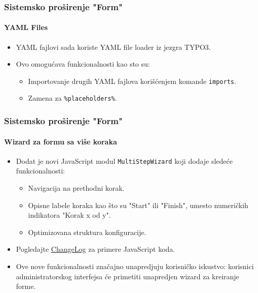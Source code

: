 
\begin{frame}[fragile]
	\frametitle{Sistemsko proširenje "Form"}
	\framesubtitle{YAML Files}

	\begin{itemize}
		\item YAML fajlovi sada koriste YAML file loader iz jezgra TYPO3.
		\item Ovo omogućava funkcionalnosti kao sto su:

			\begin{itemize}
				\item Importovanje drugih YAML fajlova korišćenjem komande \texttt{imports}.
				\item Zamena za \texttt{\%placeholders\%}.
			\end{itemize}

	\end{itemize}

\end{frame}


\begin{frame}[fragile]
	\frametitle{Sistemsko proširenje "Form"}
	\framesubtitle{Wizard za formu sa više koraka}

	\begin{itemize}
		\item Dodat je novi JavaScript modul \texttt{MultiStepWizard} koji dodaje sledeće
			funkcionalnosti:

			\begin{itemize}
				\item Navigacija na prethodni korak.
				\item Opisne labele koraka kao što su "Start" ili "Finish", umesto numeričkih indikatora "Korak x od y".
				\item Optimizovana struktura konfiguracije.
			\end{itemize}

		\item Pogledajte \href{https://docs.typo3.org/c/typo3/cms-core/master/en-us/Changelog/10.2/Feature-79445-AddMultistepWizard.html}{ChangeLog}
			za primere JavaScript koda.

		\item Ove nove funkcionalnosti značajno unapredjuju korisničko iskustvo:
			korisnici administratorskog interfejsa će primetiti unapredjen wizard za kreiranje forme.

	\end{itemize}

\end{frame}

